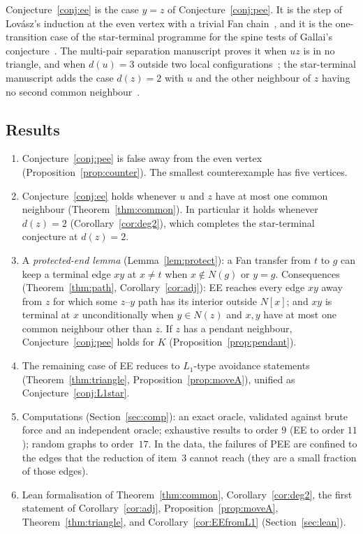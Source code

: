 \documentclass[11pt]{amsart}
\theoremstyle{definition}
\begin{document}
Conjecture~\ref{conj:ee} is the case $y=z$ of Conjecture~\ref{conj:pee}. It is the step of
Lov\'asz's induction at the even vertex with a trivial Fan chain~\cite[Proposition~16]{MS}, and it is
the one-transition case of the star-terminal programme for the spine tests of Gallai's
conjecture~\cite[Proposition~4.3]{STL}. The multi-pair separation manuscript proves it when $uz$ is in
no triangle, and when $d(u)=3$ outside two local configurations~\cite[Proposition~18]{MS}; the
star-terminal manuscript adds the case $d(z)=2$ with $u$ and the other neighbour of $z$ having no
second common neighbour~\cite[Theorem~5.1]{STL}.

\subsection*{Results}
\begin{enumerate}
\item Conjecture~\ref{conj:pee} is false away from the even vertex (Proposition~\ref{prop:counter}). The
smallest counterexample has five vertices.
\item Conjecture~\ref{conj:ee} holds whenever $u$ and $z$ have at most one common neighbour
(Theorem~\ref{thm:common}). In particular it holds whenever $d(z)=2$ (Corollary~\ref{cor:deg2}),
which completes the star-terminal conjecture at $d(z)=2$.
\item A \emph{protected-end lemma} (Lemma~\ref{lem:protect}): a Fan transfer from $t$ to $g$ can keep
a terminal edge $xy$ at $x\ne t$ when $x\notin N(g)$ or $y=g$. Consequences
(Theorem~\ref{thm:path}, Corollary~\ref{cor:adj}): EE reaches every edge $xy$ away from $z$ for which
some $z$--$y$ path has its interior outside $N[x]$; and $xy$ is terminal at $x$ unconditionally when
$y\in N(z)$ and $x,y$ have at most one common neighbour other than $z$. If $z$ has a pendant
neighbour, Conjecture~\ref{conj:pee} holds for $K$ (Proposition~\ref{prop:pendant}).
\item The remaining case of EE reduces to $L_1$-type avoidance statements
(Theorem~\ref{thm:triangle}, Proposition~\ref{prop:moveA}), unified as Conjecture~\ref{conj:L1star}.
\item Computations (Section~\ref{sec:comp}): an exact oracle, validated against brute force and an
independent oracle; exhaustive results to order $9$ (EE to order $11$); random graphs to order~$17$.
In the data, the failures of PEE are confined to the edges that the reduction of item~3 cannot
reach (they are a small fraction of those edges).
\item Lean formalisation of Theorem~\ref{thm:common}, Corollary~\ref{cor:deg2}, the first statement of
Corollary~\ref{cor:adj}, Proposition~\ref{prop:moveA}, Theorem~\ref{thm:triangle}, and
Corollary~\ref{cor:EEfromL1} (Section~\ref{sec:lean}).
\end{enumerate}
\end{document}
